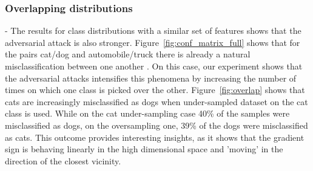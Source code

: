 \documentclass[runningheads,a4paper]{llncs}
\begin{document}
\subsubsection{Overlapping distributions} - The results for class distributions with a similar set of features shows that the adversarial attack is also stronger. Figure~\ref{fig:conf_matrix_full} shows that for the pairs cat/dog and automobile/truck there is already a natural misclassification between one another . On this case, our experiment shows that the adversarial attacks intensifies this phenomena by increasing the number of times on which one class is picked over the other. Figure~\ref{fig:overlap} shows that cats are increasingly misclassified as dogs when under-sampled dataset on the cat class is used. While on the cat under-sampling case 40\% of the samples were misclassified as dogs, on the oversampling one, 39\% of the dogs were misclassified as cats. This outcome provides interesting insights, as it shows that the gradient sign is behaving linearly in the high dimensional space and 'moving' in the direction of the closest vicinity.
\end{document}
